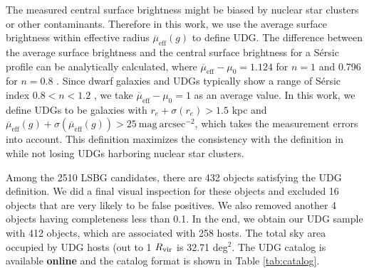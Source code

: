 \documentclass[twocolumn,astrosymb,twocolappendix]{aastex631}
\newcommand{\sbunit}{\mathrm{mag\ arcsec}^{-2}}
\newcommand{\sbeff}{\overline{\mu}_{\mathrm{eff}}(g)}
\newcommand{\sersic}{S\'ersic}
\begin{document}
\begin{CJK*}{UTF8}{gbsn}
The measured central surface brightness might be biased by nuclear star clusters \citep{Neumayer2020} or other contaminants. Therefore in this work, we use the average surface brightness within effective radius $\sbeff$ to define UDG. The difference between the average surface brightness and the central surface brightness for a \sersic{} profile can be analytically calculated, where $\overline{\mu}_{\mathrm{eff}} - \mu_0 = 1.124$ for $n=1$ and 0.796 for $n=0.8$ \citep{Graham2005,Yagi2016}. Since dwarf galaxies and UDGs typically show a range of \sersic{} index $0.8 < n < 1.2$ \citep{vanDokkum2015,ELVES-I}, we take $\overline{\mu}_{\mathrm{eff}} - \mu_0 = 1$ as an average value. In this work, we define UDGs to be galaxies with $r_e+\sigma(r_e) > 1.5$ kpc and $\sbeff + \sigma(\sbeff) > 25\ \sbunit$, which takes the measurement errors into account. This definition maximizes the consistency with the definition in \citet{vanDokkum2015} while not losing UDGs harboring nuclear star clusters.

Among the 2510 LSBG candidates, there are 432 objects satisfying the UDG definition. We did a final visual inspection for these objects and excluded 16 objects that are very likely to be false positives. We also removed another 4 objects having completeness less than 0.1. In the end, we obtain our UDG sample with 412 objects, which are associated with 258 hosts. The total sky area occupied by UDG hosts (out to 1 $R_{\rm{vir}}$ is 32.71 deg$^{2}$. The UDG catalog is available \textbf{online} and the catalog format is shown in Table \ref{tab:catalog}. 

\vspace{1em}


\end{CJK*}
\end{document}
